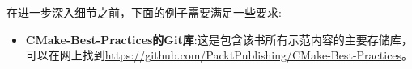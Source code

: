 在进一步深入细节之前，下面的例子需要满足一些要求:

\begin{itemize}
\item 
\textbf{CMake-Best-Practices的Git库}:这是包含该书所有示范内容的主要存储库，可以在网上找到\url{https://github.com/PacktPublishing/CMake-Best-Practices}。
\end{itemize}


